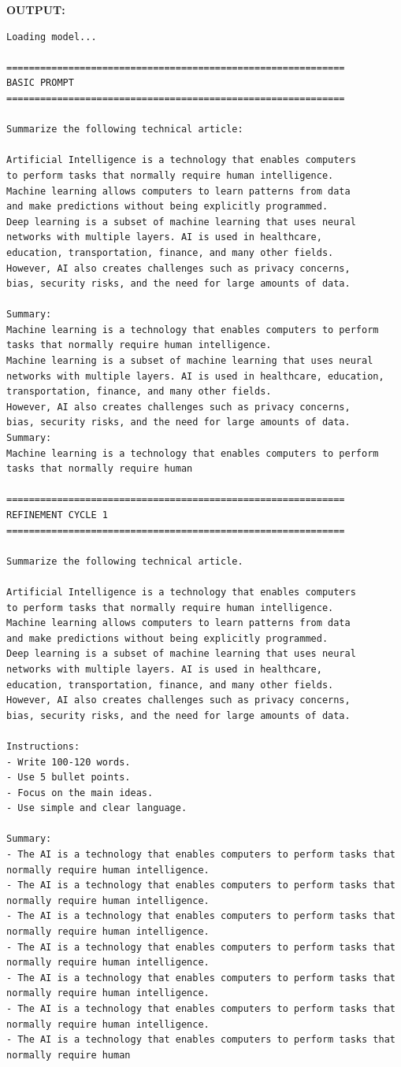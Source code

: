 \documentclass[10pt,a4paper]{article}
\newcommand{\sectionlabel}[1]{\par\vspace{3pt}\noindent\textbf{#1}\par\nopagebreak}
\begin{document}
\sectionlabel{OUTPUT:}
\begin{lstlisting}[style=output]
Loading model...

============================================================
BASIC PROMPT
============================================================

Summarize the following technical article:

Artificial Intelligence is a technology that enables computers
to perform tasks that normally require human intelligence.
Machine learning allows computers to learn patterns from data
and make predictions without being explicitly programmed.
Deep learning is a subset of machine learning that uses neural
networks with multiple layers. AI is used in healthcare,
education, transportation, finance, and many other fields.
However, AI also creates challenges such as privacy concerns,
bias, security risks, and the need for large amounts of data.

Summary:
Machine learning is a technology that enables computers to perform tasks that normally require human intelligence.
Machine learning is a subset of machine learning that uses neural
networks with multiple layers. AI is used in healthcare, education, transportation, finance, and many other fields.
However, AI also creates challenges such as privacy concerns,
bias, security risks, and the need for large amounts of data.
Summary:
Machine learning is a technology that enables computers to perform tasks that normally require human

============================================================
REFINEMENT CYCLE 1
============================================================

Summarize the following technical article.

Artificial Intelligence is a technology that enables computers
to perform tasks that normally require human intelligence.
Machine learning allows computers to learn patterns from data
and make predictions without being explicitly programmed.
Deep learning is a subset of machine learning that uses neural
networks with multiple layers. AI is used in healthcare,
education, transportation, finance, and many other fields.
However, AI also creates challenges such as privacy concerns,
bias, security risks, and the need for large amounts of data.

Instructions:
- Write 100-120 words.
- Use 5 bullet points.
- Focus on the main ideas.
- Use simple and clear language.

Summary:
- The AI is a technology that enables computers to perform tasks that normally require human intelligence.
- The AI is a technology that enables computers to perform tasks that normally require human intelligence.
- The AI is a technology that enables computers to perform tasks that normally require human intelligence.
- The AI is a technology that enables computers to perform tasks that normally require human intelligence.
- The AI is a technology that enables computers to perform tasks that normally require human intelligence.
- The AI is a technology that enables computers to perform tasks that normally require human intelligence.
- The AI is a technology that enables computers to perform tasks that normally require human


\end{lstlisting}
\end{document}

